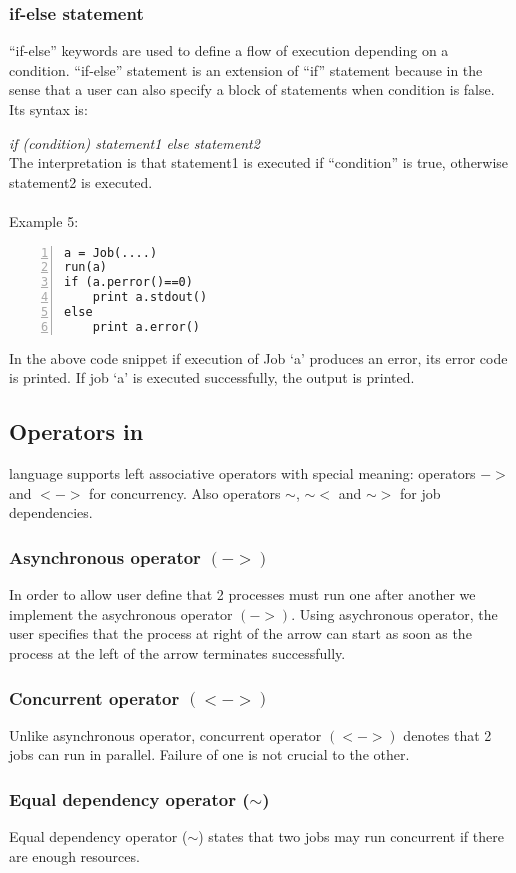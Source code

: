 \subsubsection*{if-else statement}
``if-else'' keywords are used to define a flow of execution depending on a condition. ``if-else'' statement is an extension of ``if'' statement because
in the sense that a user can also specify a block of statements when condition is false. Its syntax is:

\textit{if (condition) statement1 else statement2}\\
The interpretation is that statement1 is executed if ``condition'' is true, otherwise statement2 is executed.\\
\\
Example 5:
\begin{Verbatim}[numbers=left]
a = Job(....)
run(a)
if (a.perror()==0)
    print a.stdout()
else
    print a.error()
\end{Verbatim}

In the above code snippet if execution of Job `a' produces an error, its error code is printed. If job `a' is executed successfully, the output is printed.


\subsection*{Operators in \lang{}}

\lang{} language supports left associative operators with special meaning: operators $->$ and $<->$ for concurrency. 
Also operators $\sim$, $\sim<$ and $\sim>$ for job dependencies.
\subsubsection*{Asynchronous operator $(->)$}
In order to allow user define that 2 processes must run one after another
we implement the asychronous operator $(->)$. Using asychronous operator, the user
specifies that the process at right of the arrow can start as soon as
the process at the left of the arrow terminates successfully.
\subsubsection*{Concurrent operator $(<->)$}
Unlike asynchronous operator, concurrent operator $(<->)$ denotes that 2 jobs can
run in parallel. Failure of one is not crucial to the other.
\subsubsection*{Equal dependency operator ($\sim$)}
Equal dependency operator ($\sim$) states that two jobs may run concurrent if there
are enough resources.
